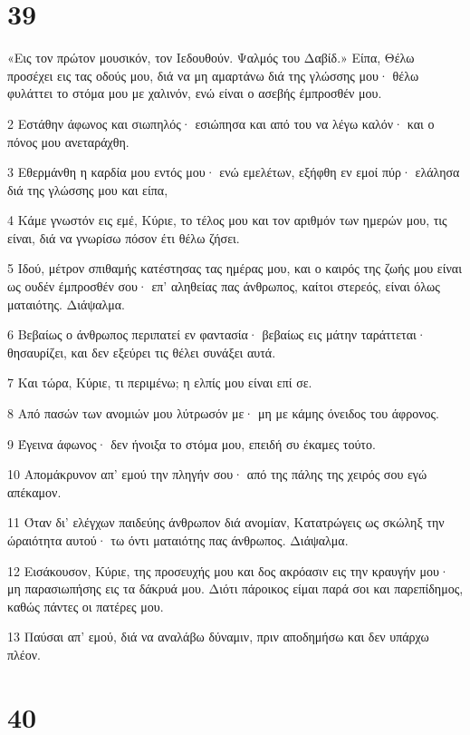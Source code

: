 \chapter{39}

\par «Εις τον πρώτον μουσικόν, τον Ιεδουθούν. Ψαλμός του Δαβίδ.» Είπα, Θέλω προσέχει εις τας οδούς μου, διά να μη αμαρτάνω διά της γλώσσης μου· θέλω φυλάττει το στόμα μου με χαλινόν, ενώ είναι ο ασεβής έμπροσθέν μου.
\par 2 Εστάθην άφωνος και σιωπηλός· εσιώπησα και από του να λέγω καλόν· και ο πόνος μου ανεταράχθη.
\par 3 Εθερμάνθη η καρδία μου εντός μου· ενώ εμελέτων, εξήφθη εν εμοί πύρ· ελάλησα διά της γλώσσης μου και είπα,
\par 4 Κάμε γνωστόν εις εμέ, Κύριε, το τέλος μου και τον αριθμόν των ημερών μου, τις είναι, διά να γνωρίσω πόσον έτι θέλω ζήσει.
\par 5 Ιδού, μέτρον σπιθαμής κατέστησας τας ημέρας μου, και ο καιρός της ζωής μου είναι ως ουδέν έμπροσθέν σου· επ' αληθείας πας άνθρωπος, καίτοι στερεός, είναι όλως ματαιότης. Διάψαλμα.
\par 6 Βεβαίως ο άνθρωπος περιπατεί εν φαντασία· βεβαίως εις μάτην ταράττεται· θησαυρίζει, και δεν εξεύρει τις θέλει συνάξει αυτά.
\par 7 Και τώρα, Κύριε, τι περιμένω; η ελπίς μου είναι επί σε.
\par 8 Από πασών των ανομιών μου λύτρωσόν με· μη με κάμης όνειδος του άφρονος.
\par 9 Έγεινα άφωνος· δεν ήνοιξα το στόμα μου, επειδή συ έκαμες τούτο.
\par 10 Απομάκρυνον απ' εμού την πληγήν σου· από της πάλης της χειρός σου εγώ απέκαμον.
\par 11 Όταν δι' ελέγχων παιδεύης άνθρωπον διά ανομίαν, Κατατρώγεις ως σκώληξ την ώραιότητα αυτού· τω όντι ματαιότης πας άνθρωπος. Διάψαλμα.
\par 12 Εισάκουσον, Κύριε, της προσευχής μου και δος ακρόασιν εις την κραυγήν μου· μη παρασιωπήσης εις τα δάκρυά μου. Διότι πάροικος είμαι παρά σοι και παρεπίδημος, καθώς πάντες οι πατέρες μου.
\par 13 Παύσαι απ' εμού, διά να αναλάβω δύναμιν, πριν αποδημήσω και δεν υπάρχω πλέον.

\chapter{40}


